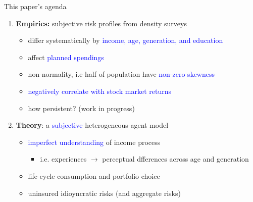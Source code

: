 \documentclass{beamer}
\begin{document}
\begin{frame}{This paper's agenda}
	\begin{enumerate}
		\item \textbf{Empirics:} subjective risk profiles from density surveys
		\begin{itemize}
			\item differ systematically by \textcolor{blue}{income, age, generation,  and education}
			\item affect  \textcolor{blue}{planned spendings} 
			\item non-normality, i.e half of population have
		    \textcolor{blue}{non-zero skewness}
			\item \textcolor{blue}{negatively correlate with stock market returns}
			 \item how persistent? (work in progress)
		\end{itemize}
		\item \textbf{Theory}: a \textcolor{blue}{subjective} heterogeneous-agent model 
		\begin{itemize}
			\item  \textcolor{blue}{imperfect understanding} of income process
			\begin{itemize}
				\item i.e. experiences $\rightarrow$ perceptual dfferences across age and generation 
			\end{itemize}
			\item life-cycle consumption and portfolio choice 
			\item uninsured idioyncratic risks (and aggregate risks)
		\end{itemize} 
\end{enumerate}
\end{frame}
\end{document}
